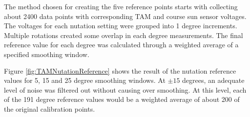 The method chosen for creating the five reference points starts with collecting about 2400 data points with corresponding TAM and course sun sensor voltages.  The voltages for each nutation setting were grouped into 1 degree increments.  Multiple rotations created some overlap in each degree measurements.  The final reference value for each degree was calculated through a weighted average of a specified smoothing window.

Figure \ref{fig:TAMNutationReference} shows the result of the nutation reference values for 5, 15 and 25 degree smoothing windows.  At $\pm 15$ degrees, an adequate level of noise was filtered out without causing over smoothing.  At this level, each of the 191 degree reference values would be a weighted average of about 200 of the original calibration points.


